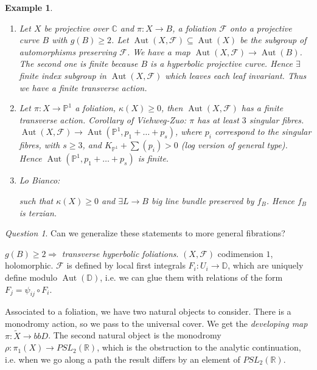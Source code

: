 \documentclass[12pt]{article}
\theoremstyle{darkgreentheorem}
\theoremstyle{darkbluedefinition}
\theoremstyle{darkredexample}
\newtheorem{exa}[thm]{Example}
\theoremstyle{remark}
\newtheorem{q}[thm]{Question}
\newcommand{\R}{\mathbb{R}}
\newcommand{\1}{\mathbbm{1}}
\newcommand{\C}{\mathbb{C}}
\renewcommand{\P}{\mathbb{P}}
\newcommand{\bbD}{\mathbb{D}}
\newcommand{\F}{\mathcal{F}}
\DeclareMathOperator{\Aut}{Aut}
\newcommand{\sub}{\subseteq}
\begin{document}
\begin{exa}
    \begin{enumerate}
	\item Let $X$ be projective over $\C$ and $\pi\colon X\to B$, a foliation $\F$ onto a projective curve $B$ with $g(B)\geqslant 2$.
	    Let $\Aut(X,\F)\sub\Aut(X)$ be the subgroup of automorphisms preserving $\F$.
	    We have a map $\Aut(X,\F)\to \Aut(B)$.
	    The second one is finite because $B$ is a hyperbolic projective curve.
	    Hence $\exists $ finite index subgroup in $\Aut(X,\F)$ which leaves each leaf invariant.
	    Thus we have a finite transverse action.
	\item Let $\pi\colon X\to \P^{1}$ a foliation, $\kappa(X)\geqslant 0$, then $\Aut(X,\F)$ has a finite transverse action.
	    Corollary of Viehweg-Zuo: $\pi$ has at least $3$ singular fibres.
	    $\Aut(X,\F)\to \Aut(\P^{1},p_{1}+\ldots +p_{s})$, where $p_{i}$ correspond to the singular fibres, with $s\geqslant 3$, and $K_{\P^{1}}+\sum(p_{i}) >0$ (log version of general type).
	    Hence $\Aut(\P^{1},p_{1}+\ldots+p_{s})$ is finite.
	\item Lo Bianco:
	    \begin{center}
	    \end{center}
	    such that $\kappa(X)\geqslant 0$ and $\exists L\to B$ big line bundle preserved by $f_{B}$.
	    Hence $f_{B}$ is terzian.
    \end{enumerate}
\end{exa}

\begin{q}
    Can we generalize these statements to more general fibrations?
\end{q}
$g(B)\geqslant 2\Rightarrow $ \textit{transverse hyperbolic foliations}.
$(X,\F)$ codimension $1$, holomorphic.
$\F$ is defined by local first integrals $F_{i}\colon U_{i}\to \bbD$, which are uniquely define modulo $\Aut(\bbD)$, i.e. we can glue them with relations of the form $F_{j}=\psi_{ij}\circ F_{i}$.

Associated to a foliation, we have two natural objects to consider.
There is a monodromy action, so we pass to the universal cover.
We get the \textit{developing map} $\pi\colon \tilde{X}\to bbD$.
The second natural object is the monodromy $\rho\colon \pi_{1}(X)\to PSL_{2}(\R)$, which is the obstruction to the analytic continuation, i.e. when we go along a path the result differs by an element of $PSL_{2}(\R)$.
\end{document}
